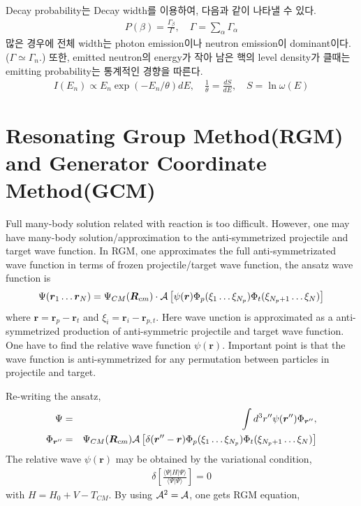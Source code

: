 \documentclass[11pt]{book}
\def\bm{\boldsymbol}
\def\vr{{\bm r}}
\def\vR{{\bm R}}
\def\la{\langle}
\def\ra{\rangle}
\newcommand{\bea}{\begin{eqnarray}}
\newcommand{\eea}{\end{eqnarray}}
\newcommand{\no}{\nonumber \\}
\begin{document}
Decay probability는 Decay width를 이용하여, 다음과 같이 나타낼 수 있다. 
\bea 
P(\beta)=\frac{\Gamma_\beta}{\Gamma},\quad \Gamma =\sum_\alpha \Gamma_\alpha 
\eea 
많은 경우에 전체 width는 photon emission이나 neutron emission이 dominant이다. 
($\Gamma\simeq \Gamma_n$.) 또한, emitted neutron의 energy가 작아
남은 핵의 level density가 클때는 emitting probability는 통계적인
경향을 따른다. 
\bea 
I(E_n)\propto E_n \exp(-E_n/\theta) dE,\quad \frac{1}{\theta}= \frac{d S}{dE},\quad S=\ln \omega(E)
\eea 

\chapter{Resonating Group Method(RGM) and Generator Coordinate Method(GCM)} 

Full many-body solution related with reaction is too difficult. 
However, one may have many-body solution/approximation to the anti-symmetrized 
projectile and target wave function. 
In RGM, one approximates the full anti-symmetrizated wave function 
in terms of frozen projectile/target wave function, the ansatz wave function is 
\bea 
\Psi(\vr_1\dots\vr_N)=\Psi_{CM}(\vR_{cm})\cdot{\cal A}\left[\psi(\vr)\Phi_p(\xi_1\dots \xi_{N_p}) \Phi_t(\xi_{N_p+1}\dots \xi_{N})\right] 
\eea 
where $\vr=\vr_p-\vr_t$ and $\xi_i = \vr_i - \vr_{p,t}$. 
Here wave unction is approximated as a anti-symmetrized production of 
anti-symmetric projectile and target wave function. One have to find 
the relative wave function $\psi(\vr)$. Important point is that the wave function 
is anti-symmetrized for any permutation between particles in projectile and target.  

Re-writing the ansatz,
\bea 
\Psi &=& \int d^3 r'' \psi(\vr'')\Phi_{\vr''},\no 
\Phi_{\vr''}&=& \Psi_{CM}(\vR_{cm}){\cal A} \left[\delta(\vr''-\vr)\Phi_p(\xi_1\dots \xi_{N_p}) \Phi_t(\xi_{N_p+1}\dots \xi_{N})\right] 
\eea 
The relative wave $\psi(\vr)$ may be obtained by the variational condition,
\bea 
\delta\left[\frac{\la\Psi|H|\Psi\ra}{\la\Psi|\Psi\ra} \right] = 0 
\eea 
with $H= H_0+V-T_{CM}$. 
By using ${\cal A}^2={\cal A}$, one  gets RGM equation, 
\end{document}
